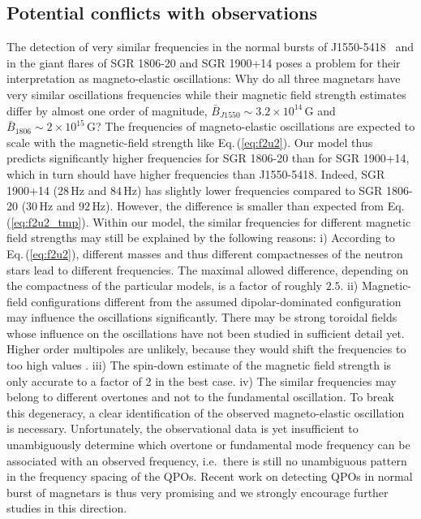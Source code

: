 \documentclass[useAMS,usenatbib]{mnras}
\begin{document}
%
\subsection{Potential conflicts with observations}
%
The detection of very similar frequencies in the normal bursts of J1550-5418~\citep{Huppenkothen2014a} and in the giant flares of SGR 1806-20 and SGR 1900+14 poses a problem for their interpretation as magneto-elastic oscillations: Why do all three magnetars have very similar oscillations frequencies while their magnetic field strength estimates differ by almost one order of magnitude, $\bar B_{J1550}\sim 3.2\times10^{14}\,$G and $\bar B_{1806}\sim 2\times10^{15}\,$G? The frequencies of magneto-elastic oscillations are expected to scale with the magnetic-field strength like Eq.\,(\ref{eq:f2u2}). Our model thus 
predicts significantly higher frequencies for SGR 1806-20 than for SGR 1900+14, 
which in turn should have higher frequencies than J1550-5418. Indeed, SGR 
1900+14 ($28\,$Hz and $84\,$Hz) has slightly lower frequencies compared to SGR 
1806-20 ($30\,$Hz and $92\,$Hz). However, the difference is smaller than 
expected from Eq.\,(\ref{eq:f2u2_tmp}).
Within our model, the similar frequencies for different magnetic field strengths may still be explained by the following reasons:
i) According to Eq.\,(\ref{eq:f2u2}), different masses and thus different 
compactnesses of the neutron stars lead to different frequencies. The maximal 
allowed difference, depending on the compactness of the particular models, is a 
factor of roughly $2.5$. ii) Magnetic-field configurations different from the 
assumed dipolar-dominated configuration may influence the oscillations 
significantly. There may be strong toroidal fields whose influence on the 
oscillations have not been studied in sufficient detail yet. Higher order 
multipoles are unlikely, because they would shift the frequencies to too high 
values \citep{Gabler2013a}. iii) The spin-down estimate of the magnetic 
field strength is only accurate to a factor of 2 in the best case. iv) The 
similar frequencies may belong to different overtones and not to the 
fundamental oscillation. To break this degeneracy,  a clear identification of 
the observed magneto-elastic oscillation is necessary. Unfortunately, the 
observational data is yet insufficient to unambiguously determine which overtone 
or fundamental mode frequency can 
be associated with an observed frequency, i.e.~there is still no unambiguous pattern in the frequency spacing of the QPOs. Recent work on detecting QPOs in normal burst of magnetars is thus very promising \citep{Huppenkothen2014a,Huppenkothen2014b} and we strongly encourage further studies in this direction.
\end{document}

